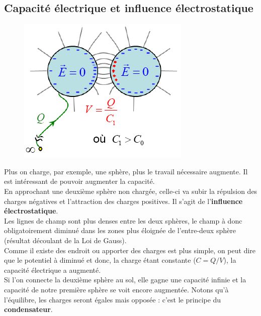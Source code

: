 \documentclass	[11pt, a4paper, openany]{book}
\begin{document}
\subsection{Capacité électrique et influence électrostatique}
\begin{figure}
\includegraphics[scale=0.44]{es/image13.png}
\end{figure}
Plus on charge, par exemple, une sphère, plus le travail nécessaire augmente. Il est intéressant de pouvoir augmenter la capacité.\\
En approchant une deuxième sphère non chargée, celle-ci va subir la répulsion des charges négatives et l'attraction des charges positives. Il s'agit de l'\textbf{influence électrostatique}.\\
Les lignes de champ sont plus denses entre les deux sphères, le champ à donc obligatoirement diminué dans les zones plus éloignée de l'entre-deux sphère (résultat découlant de la Loi de Gauss).\\
Comme il existe des endroit ou apporter des charges est plus simple, on peut dire que le potentiel à diminué et donc, la charge étant constante ($C = Q/V$), la capacité électrique a augmenté.\\ Si l'on connecte la deuxième sphère au sol, elle gagne une capacité infinie et la capacité de notre première sphère se voit encore augmentée. Notons qu'à l'équilibre, les charges seront égales mais opposée : c'est le principe du \textbf{condensateur}.
\end{document}
